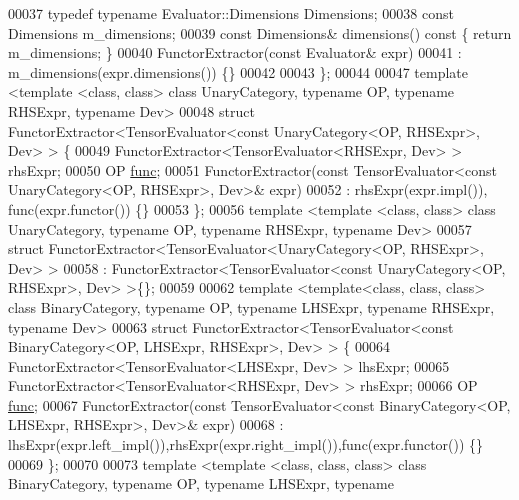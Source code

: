\begin{DoxyCode}
00037   \textcolor{keyword}{typedef} \textcolor{keyword}{typename} Evaluator::Dimensions Dimensions;
00038   \textcolor{keyword}{const} Dimensions m\_dimensions;
00039   \textcolor{keyword}{const} Dimensions& dimensions()\textcolor{keyword}{ const }\{ \textcolor{keywordflow}{return} m\_dimensions; \}
00040   FunctorExtractor(\textcolor{keyword}{const} Evaluator& expr)
00041   : m\_dimensions(expr.dimensions()) \{\}
00042 
00043 \};
00044 
00047 \textcolor{keyword}{template} <\textcolor{keyword}{template} <\textcolor{keyword}{class}, \textcolor{keyword}{class}> \textcolor{keyword}{class }UnaryCategory, \textcolor{keyword}{typename} OP, \textcolor{keyword}{typename} RHSExpr, \textcolor{keyword}{typename} Dev>
00048 \textcolor{keyword}{struct }FunctorExtractor<TensorEvaluator<const UnaryCategory<OP, RHSExpr>, Dev> > \{
00049   FunctorExtractor<TensorEvaluator<RHSExpr, Dev> > rhsExpr;
00050   OP \hyperlink{structfunc}{func};
00051   FunctorExtractor(\textcolor{keyword}{const} TensorEvaluator<\textcolor{keyword}{const} UnaryCategory<OP, RHSExpr>, Dev>& expr)
00052   : rhsExpr(expr.impl()), func(expr.functor()) \{\}
00053 \};
00056 \textcolor{keyword}{template} <\textcolor{keyword}{template} <\textcolor{keyword}{class}, \textcolor{keyword}{class}> \textcolor{keyword}{class }UnaryCategory, \textcolor{keyword}{typename} OP, \textcolor{keyword}{typename} RHSExpr, \textcolor{keyword}{typename} Dev>
00057 \textcolor{keyword}{struct }FunctorExtractor<TensorEvaluator<UnaryCategory<OP, RHSExpr>, Dev> >
00058 : FunctorExtractor<TensorEvaluator<const UnaryCategory<OP, RHSExpr>, Dev> >\{\};
00059 
00062 \textcolor{keyword}{template} <\textcolor{keyword}{template}<\textcolor{keyword}{class}, \textcolor{keyword}{class}, \textcolor{keyword}{class}> \textcolor{keyword}{class }BinaryCategory, \textcolor{keyword}{typename} OP, \textcolor{keyword}{typename} LHSExpr, \textcolor{keyword}{typename} 
      RHSExpr, \textcolor{keyword}{typename} Dev>
00063 \textcolor{keyword}{struct }FunctorExtractor<TensorEvaluator<const BinaryCategory<OP, LHSExpr, RHSExpr>, Dev> > \{
00064   FunctorExtractor<TensorEvaluator<LHSExpr, Dev> > lhsExpr;
00065   FunctorExtractor<TensorEvaluator<RHSExpr, Dev> > rhsExpr;
00066   OP \hyperlink{structfunc}{func};
00067   FunctorExtractor(\textcolor{keyword}{const} TensorEvaluator<\textcolor{keyword}{const} BinaryCategory<OP, LHSExpr, RHSExpr>, Dev>& expr)
00068   : lhsExpr(expr.left\_impl()),rhsExpr(expr.right\_impl()),func(expr.functor()) \{\}
00069 \};
00070 
00073 \textcolor{keyword}{template} <\textcolor{keyword}{template} <\textcolor{keyword}{class}, \textcolor{keyword}{class}, \textcolor{keyword}{class}> \textcolor{keyword}{class }BinaryCategory, \textcolor{keyword}{typename} OP, \textcolor{keyword}{typename} LHSExpr, \textcolor{keyword}{typename} 

\end{DoxyCode}
